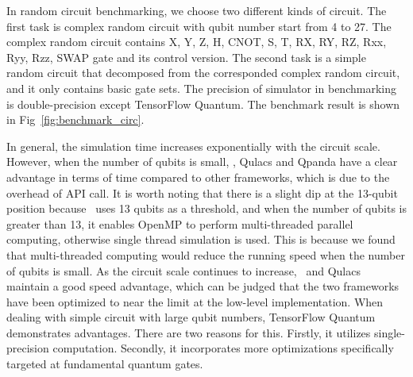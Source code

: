 In random circuit benchmarking, we choose two different kinds of circuit. The first task is complex random circuit with qubit number start from 4 to 27. The complex random circuit contains X, Y, Z, H, CNOT, S, T, RX, RY, RZ, Rxx, Ryy, Rzz, SWAP gate and its control version. The second task is a simple random circuit that decomposed from the corresponded complex random circuit, and it only contains basic gate sets. The precision of simulator in benchmarking is double-precision except TensorFlow Quantum. The benchmark result is shown in Fig~\ref{fig:benchmark_circ}.


In general, the simulation time increases exponentially with the circuit scale. However, when the number of qubits is small, \MindQuantum, Qulacs and Qpanda have a clear advantage in terms of time compared to other frameworks, which is due to the overhead of API call. It is worth noting that there is a slight dip at the 13-qubit position because \MindQuantum\ uses 13 qubits as a threshold, and when the number of qubits is greater than 13, it enables OpenMP to perform multi-threaded parallel computing, otherwise single thread simulation is used. This is because we found that multi-threaded computing would reduce the running speed when the number of qubits is small. As the circuit scale continues to increase, \MindQuantum\ and Qulacs maintain a good speed advantage, which can be judged that the two frameworks have been optimized to near the limit at the low-level implementation. When dealing with simple circuit with large qubit numbers, TensorFlow Quantum demonstrates advantages. There are two reasons for this. Firstly, it utilizes single-precision computation. Secondly, it incorporates more optimizations specifically targeted at fundamental quantum gates.

